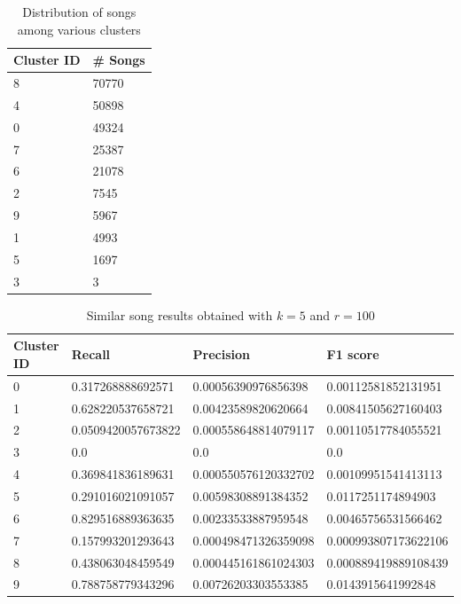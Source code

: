 \documentclass[10pt,a4paper]{scrartcl}
\begin{document}
\begin{table}[h]
\centering
\begin{tabular}{@{}ll@{}}
\toprule
Cluster ID & \# Songs \\ \midrule
8           & 70770      \\
4           & 50898      \\
0           & 49324      \\
7           & 25387      \\
6           & 21078      \\
2           & 7545       \\
9           & 5967       \\
1           & 4993       \\
5           & 1697       \\
3           & 3          \\ \bottomrule
\end{tabular}
\caption{Distribution of songs among various clusters}
\label{tab:song_dis}
\end{table}
  
\begin{table}[h]
\centering
\begin{tabular}{@{}llll@{}}
\toprule
Cluster ID & Recall             & Precision            & F1 score             \\ \midrule
0          & 0.317268888692571  & 0.00056390976856398  & 0.00112581852131951  \\
1          & 0.628220537658721  & 0.00423589820620664  & 0.00841505627160403  \\
2          & 0.0509420057673822 & 0.000558648814079117 & 0.00110517784055521  \\
3          & 0.0                   & 0.0                     &  0.0                    \\
4          & 0.369841836189631  & 0.000550576120332702 & 0.00109951541413113  \\
5          & 0.291016021091057  & 0.00598308891384352  & 0.0117251174894903   \\
6          & 0.829516889363635  & 0.00233533887959548  & 0.00465756531566462  \\
7          & 0.157993201293643  & 0.000498471326359098 & 0.000993807173622106 \\
8          & 0.438063048459549  & 0.000445161861024303 & 0.000889419889108439 \\
9          & 0.788758779343296  & 0.00726203303553385  & 0.0143915641992848   \\ \bottomrule
\end{tabular}
\caption{Similar song results obtained with $k = 5$ and $r = 100$}
\label{tab:res}
\end{table}
\end{document}
